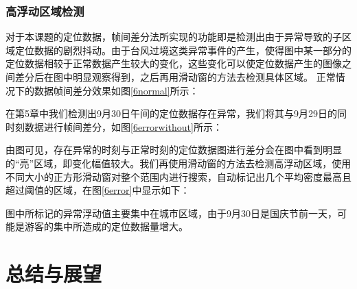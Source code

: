 \documentclass[a4paper,AutoFakeBold,oneside,12pt]{book}
\begin{document}
\subsection{高浮动区域检测}
	对于本课题的定位数据，帧间差分法所实现的功能即是检测出由于异常导致的子区域定位数据的剧烈抖动。由于台风过境这类异常事件的产生，使得图中某一部分的定位数据相较于正常数据产生较大的变化，这些变化可以使定位数据产生的图像之间差分后在图中明显观察得到，之后再用滑动窗的方法去检测具体区域。
	正常情况下的数据帧间差分效果如图\ref{6normal}所示：


	在第5章中我们检测出9月30日午间的定位数据存在异常，我们将其与9月29日的同时刻数据进行帧间差分，如图\ref{6errorwithout}所示：


	由图可见，存在异常的时刻与正常时刻的定位数据图进行差分会在图中看到明显的“亮”区域，即变化幅值较大。我们再使用滑动窗的方法去检测高浮动区域，使用不同大小的正方形滑动窗对整个范围内进行搜索，自动标记出几个平均密度最高且超过阈值的区域，在图\ref{6error}中显示如下：


	图中所标记的异常浮动值主要集中在城市区域，由于9月30日是国庆节前一天，可能是游客的集中所造成的定位数据量增大。 

\chapter{总结与展望}
\end{document}
